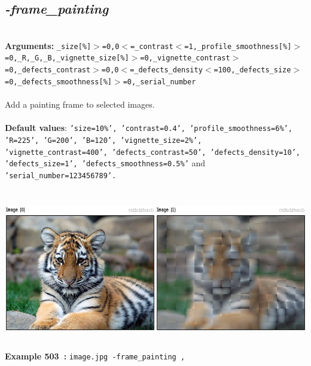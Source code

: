 \documentclass[a4paper,11pt,twoside]{book}
\begin{document}
\subsection{\emph{-frame\_painting} }\vspace*{-0.5em}
~\\\textbf{Arguments: } 
{\small \texttt{\_size[\%]$>$=0,0$<$=\_contrast$<$=1,\_profile\_smoothness[\%]$>$=0,\_R,\_G,\_B,\_vignette\_size[\%]$>$=0,\_vignette\_contrast$>$=0,\_defects\_contrast$>$=0,0$<$=\_defects\_density$<$=100,\_defects\_size$>$=0,\_defects\_smoothness[\%]$>$=0,\_serial\_number}}\\~\\
Add a painting frame to selected images.
~\\~\\\textbf{Default values}: {\small \texttt{'size=10\%', 'contrast=0.4', 'profile\_smoothness=6\%', 'R=225', 'G=200', 'B=120', 'vignette\_size=2\%', 'vignette\_contrast=400', 'defects\_contrast=50', 'defects\_density=10', 'defects\_size=1', 'defects\_smoothness=0.5\%'} and \texttt{'serial\_number=123456789'.}}
\begin{center}\includegraphics[keepaspectratio=true,height=7cm,width=\textwidth]{img/gmic_def503.jpg}\\
{\footnotesize \textbf{Example 503~:} \texttt{image.jpg -frame\_painting ,}}
\end{center}
\end{document}
